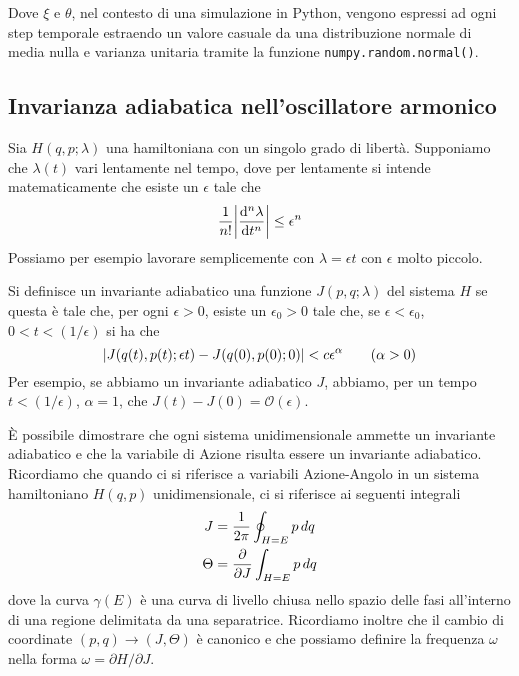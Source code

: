 \documentclass[10pt,a4paper]{article}
\begin{document}
Dove $\xi$ e $\theta$, nel contesto di una simulazione in Python, vengono espressi ad ogni step temporale estraendo un valore casuale da una distribuzione normale di media nulla e varianza unitaria tramite la funzione \lstinline{numpy.random.normal()}.

\subsection{Invarianza adiabatica nell'oscillatore armonico}
Sia $H(q,p;\lambda)$ una hamiltoniana con un singolo grado di libertà. Supponiamo che $\lambda(t)$ vari lentamente nel tempo, dove per lentamente si intende matematicamente che esiste un $\epsilon$ tale che
\begin{equation}
	\frac{1}{n!}\abs{\dv[n]{\lambda}{t}} \leq \epsilon^n
\end{equation}
Possiamo per esempio lavorare semplicemente con $\lambda = \epsilon t$ con $\epsilon$ molto piccolo.

Si definisce un invariante adiabatico una funzione $J(p,q;\lambda)$ del sistema $H$ se questa è tale che, per ogni $\epsilon > 0$, esiste un $\epsilon_0>0$ tale che, se $\epsilon < \epsilon_0$, $0<t<(1/\epsilon)$ si ha che
\begin{equation}
	\abs{J(q(t),p(t);\epsilon t) - J(q(0), p(0);0)}<c\epsilon^\alpha \quad\quad (\alpha > 0)
\end{equation}
Per esempio, se abbiamo un invariante adiabatico $J$, abbiamo, per un tempo $t<(1/\epsilon)$, $\alpha=1$, che $J(t)-J(0) = \mathcal{O}(\epsilon)$.

È possibile dimostrare che ogni sistema unidimensionale ammette un invariante adiabatico e che la variabile di Azione risulta essere un invariante adiabatico. Ricordiamo che quando ci si riferisce a variabili Azione-Angolo in un sistema hamiltoniano $H(q,p)$ unidimensionale, ci si riferisce ai seguenti integrali
\begin{align}
	J &= \frac{1}{2\pi} \oint_{H=E} p\,dq \\
	\Theta &= \pdv{}{J} \int_{H=E} p\,dq
\end{align}
dove la curva $\gamma(E)$ è una curva di livello chiusa nello spazio delle fasi all'interno di una regione delimitata da una separatrice. Ricordiamo inoltre che il cambio di coordinate $(p,q)\to(J,\Theta)$ è canonico e che possiamo definire la frequenza $\omega$ nella forma $\omega = \partial H / \partial J$.
\end{document}
